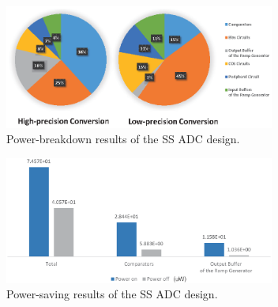 \begin{figure}[htbp]
	\centerline{\includegraphics[width=3.5in]{./Figures/SSResults1.eps}}
	\caption{Power-breakdown results of the SS ADC design.}
	\label{SSresults1}
\end{figure}

\begin{figure}[htbp]
	\centerline{\includegraphics[width=3.5in]{./Figures/SSResults2.eps}}
	\caption{Power-saving results of the SS ADC design.}
	\label{SSresults2}
\end{figure} 

